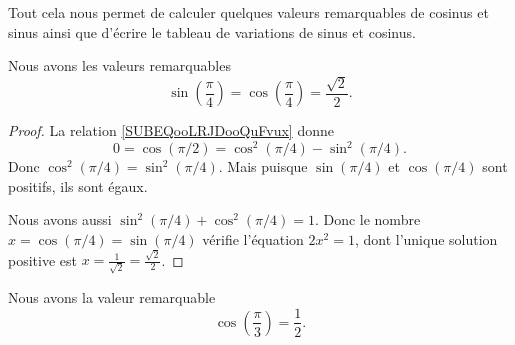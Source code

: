 Tout cela nous permet de calculer quelques valeurs remarquables de cosinus et sinus ainsi que d'écrire le tableau de variations de sinus et cosinus.

\begin{lemma}       \label{LEMooIGNPooPEctJy}
	Nous avons les valeurs remarquables
	\begin{equation}
		\sin(\frac{ \pi }{ 4 })=\cos(\frac{ \pi }{ 4 })=\frac{ \sqrt{ 2 } }{2}.
	\end{equation}
\end{lemma}

\begin{proof}
	La relation \eqref{SUBEQooLRJDooQuFvux} donne
	\begin{equation}
		0=\cos(\pi/2)=\cos^2(\pi/4)-\sin^2(\pi/4).
	\end{equation}
	Donc \( \cos^2(\pi/4)=\sin^2(\pi/4)\). Mais puisque \( \sin(\pi/4)\) et \( \cos(\pi/4)\) sont positifs, ils sont égaux.

	Nous avons aussi \( \sin^2(\pi/4)+\cos^2(\pi/4)=1\). Donc le nombre \( x=\cos(\pi/4)=\sin(\pi/4)\) vérifie l'équation \( 2x^2=1\), dont l'unique solution positive est \( x=\frac{1}{ \sqrt{ 2 } }=\frac{ \sqrt{ 2 } }{2}\).
\end{proof}

\begin{lemma}       \label{LEMooRMHAooDEAPMw}
	Nous avons la valeur remarquable
	\begin{equation}
		\cos(\frac{ \pi }{ 3 })=\frac{ 1 }{2}.
	\end{equation}
\end{lemma}

